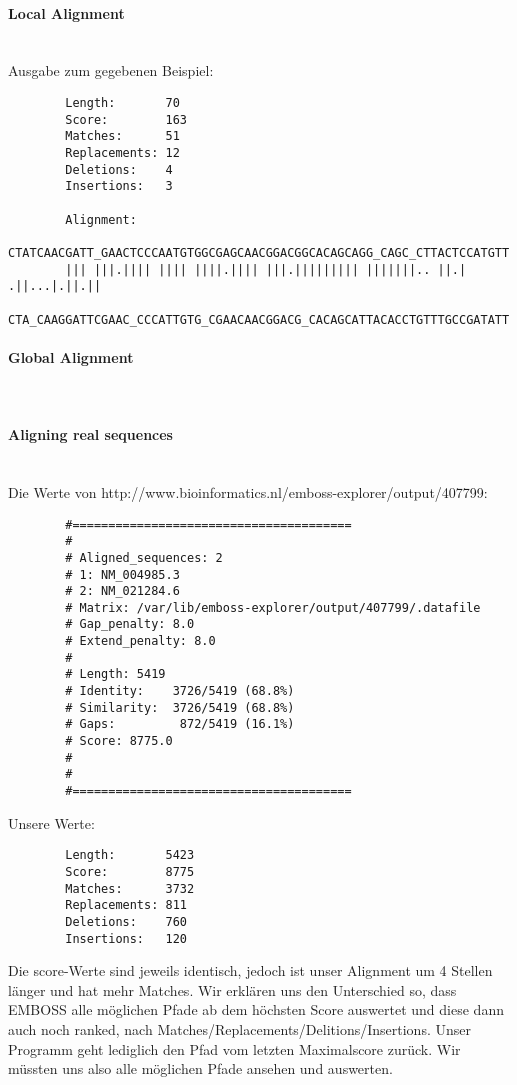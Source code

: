 \documentclass[a4paper,10pt]{article}
\begin{document}
	\parindent0pt
	\paragraph{Local Alignment}\ \\
		Ausgabe zum gegebenen Beispiel:
		\begin{verbatim}
		Length:       70
		Score:        163
		Matches:      51
		Replacements: 12
		Deletions:    4
		Insertions:   3
		
		Alignment: 
		CTATCAACGATT_GAACTCCCAATGTGGCGAGCAACGGACGGCACAGCAGG_CAGC_CTTACTCCATGTT
		||| |||.|||| |||| ||||.|||| |||.||||||||| |||||||.. ||.| .||...|.||.||
		CTA_CAAGGATTCGAAC_CCCATTGTG_CGAACAACGGACG_CACAGCATTACACCTGTTTGCCGATATT
		\end{verbatim}
	
	\paragraph{Global Alignment}\ \\
	

	\paragraph{Aligning real sequences}\ \\
		Die Werte von http://www.bioinformatics.nl/emboss-explorer/output/407799: 
		\begin{verbatim}
		#=======================================
		#
		# Aligned_sequences: 2
		# 1: NM_004985.3
		# 2: NM_021284.6
		# Matrix: /var/lib/emboss-explorer/output/407799/.datafile
		# Gap_penalty: 8.0
		# Extend_penalty: 8.0
		#
		# Length: 5419
		# Identity:    3726/5419 (68.8%)
		# Similarity:  3726/5419 (68.8%)
		# Gaps:         872/5419 (16.1%)
		# Score: 8775.0
		# 
		#
		#=======================================
		\end{verbatim}
		Unsere Werte:
		\begin{verbatim}
		Length:       5423
		Score:        8775
		Matches:      3732
		Replacements: 811
		Deletions:    760
		Insertions:   120
		\end{verbatim}
		Die score-Werte sind jeweils identisch, jedoch ist unser Alignment um 4 Stellen länger und hat mehr Matches. Wir erklären uns den Unterschied so, dass EMBOSS alle möglichen Pfade ab dem höchsten Score auswertet und diese dann auch noch ranked, nach Matches/Replacements/Delitions/Insertions. Unser Programm geht lediglich den Pfad vom letzten Maximalscore zurück. Wir müssten uns also alle möglichen Pfade ansehen und auswerten.
	
	
	
	
	
	
	
	
\end{document}
